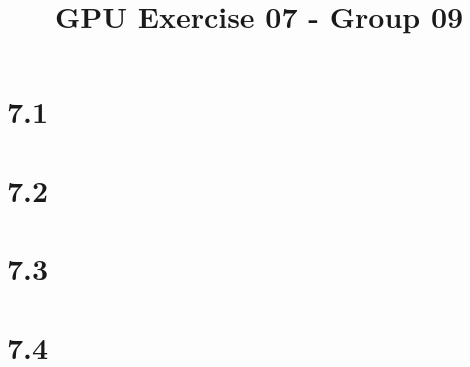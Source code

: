 \documentclass{report}
\begin{document}
\title{GPU Exercise 07 - Group 09}
\maketitle

\section*{7.1}

\section*{7.2}
   
\section*{7.3}

\section*{7.4}
\end{document}
